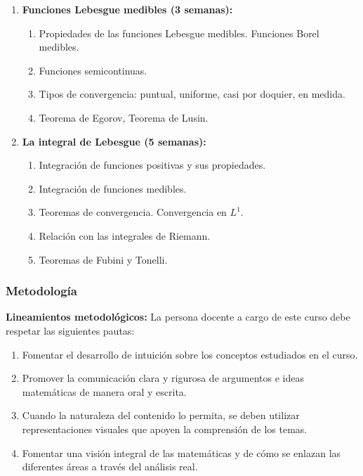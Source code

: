 \begin{refsection}
\begin{enumerate}
\begin{enumerate}
    \item La medida exterior de Lebesgue.
    \item Conjuntos Lebesgue medibles. Ejemplo de un conjunto no medible.
    \item Caracterización de Carathéodory de la medibilidad.
    \item Propiedades de la medida de Lebesgue.
\end{enumerate}

\item \textbf{Funciones Lebesgue medibles (3 semanas):} 
\begin{enumerate}
    \item Propiedades de las funciones Lebesgue medibles. Funciones Borel medibles.
    \item Funciones semicontinuas.
    \item Tipos de convergencia: puntual, uniforme, casi por doquier, en medida.
    \item Teorema de Egorov, Teorema de Lusin.
\end{enumerate}


\item \textbf{La integral de Lebesgue (5 semanas):} 
\begin{enumerate}
    \item Integración de funciones positivas y sus propiedades.
    \item Integración de funciones medibles.
    \item Teoremas de convergencia. Convergencia en $L^1$.
    \item Relación con las integrales de Riemann.
    \item Teoremas de Fubini y Tonelli.
\end{enumerate}



\end{enumerate}

\subsubsection*{Metodología}

\noindent \textbf{Lineamientos metodológicos:} La persona docente a cargo de este curso debe respetar las siguientes pautas:
\begin{enumerate}
    \item Fomentar el desarrollo de intuición sobre los conceptos estudiados en el curso. 
    \item Promover la comunicación clara y rigurosa de argumentos e ideas matemáticas de manera oral y escrita.
    \item Cuando la naturaleza del contenido lo permita, se deben utilizar representaciones visuales que apoyen la comprensión de los temas.
    \item Fomentar una visión integral de las matemáticas y de cómo se enlazan las diferentes áreas a través del análisis real.
\end{enumerate}


\end{refsection}
